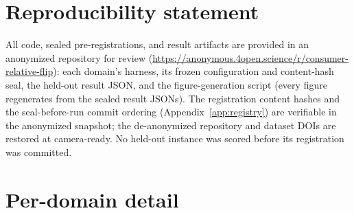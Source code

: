 \documentclass[10pt]{article} %
\theoremstyle{remark}
\begin{document}
\section*{Reproducibility statement}
All code, sealed pre-registrations, and result artifacts are provided in an anonymized
repository for review (\url{https://anonymous.4open.science/r/consumer-relative-flip}): each
domain's harness, its frozen configuration and content-hash seal, the held-out result JSON,
and the figure-generation script (every figure regenerates from the sealed result JSONs).
The registration content hashes and the seal-before-run commit ordering
(Appendix~\ref{app:registry}) are verifiable in the anonymized snapshot; the de-anonymized
repository and dataset DOIs are restored at camera-ready. No held-out instance was scored
before its registration was committed.





\appendix

\section{Per-domain detail}\label{app:domains}
\end{document}
